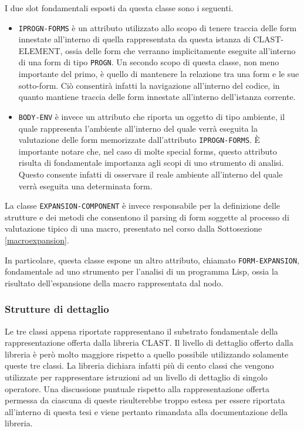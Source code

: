 I due slot fondamentali esposti da questa classe sono i seguenti.

\begin{itemize}

\item \texttt{IPROGN-FORMS} è un attributo utilizzato allo scopo di tenere
traccia delle form innestate all’interno di quella rappresentata da questa
istanza di CLAST-ELEMENT, ossia delle form che verranno implicitamente
eseguite all’interno di una form di tipo \texttt{PROGN}. Un secondo scopo di
questa classe, non meno importante del primo, è quello di mantenere la
relazione tra una form e le sue sotto-form. Ciò consentirà infatti la
navigazione all'interno del codice, in quanto mantiene traccia delle form
innestate all'interno dell'istanza corrente.

\item \texttt{BODY-ENV} è invece un attributo che riporta un oggetto di tipo
ambiente, il quale rappresenta l'ambiente all’interno del quale verrà eseguita
la valutazione delle form memorizzate dall’attributo \texttt{IPROGN-FORMS}. È
importante notare che, nel caso di molte special forms, questo attributo risulta
di fondamentale importanza agli scopi di uno strumento di analisi. Questo
consente infatti di osservare il reale ambiente all'interno del quale verrà
eseguita una determinata form.

\end{itemize}

La classe \texttt{EXPANSION-COMPONENT} è invece responsabile per la
definizione delle strutture e dei metodi che consentono il parsing di form
soggette al processo di valutazione tipico di una macro, presentato nel corso
dalla Sottosezione \ref{macroexpansion}.

In particolare, questa classe espone un altro attributo, chiamato \texttt
{FORM-EXPANSION}, fondamentale ad uno strumento per l’analisi di un programma
Lisp, ossia la risultato dell’espansione della macro rappresentata dal nodo.\\

\subsubsection{Strutture di dettaglio}

Le tre classi appena riportate rappresentano il substrato fondamentale della
rappresentazione offerta dalla libreria CLAST. Il livello di dettaglio offerto
dalla libreria è però molto maggiore rispetto a quello possibile utilizzando
solamente queste tre classi. La libreria dichiara infatti più di cento classi
che vengono utilizzate per rappresentare istruzioni ad un livello di dettaglio
di singolo operatore. Una discussione puntuale rispetto alla rappresentazione
offerta permessa da ciascuna di queste risulterebbe troppo estesa per essere
riportata all’interno di questa tesi e viene pertanto rimandata alla
documentazione della libreria.\\

